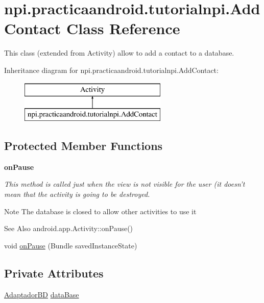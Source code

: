 \hypertarget{classnpi_1_1practicaandroid_1_1tutorialnpi_1_1_add_contact}{\section{npi.\-practicaandroid.\-tutorialnpi.\-Add\-Contact Class Reference}
\label{classnpi_1_1practicaandroid_1_1tutorialnpi_1_1_add_contact}
}


This class (extended from Activity) allow to add a contact to a database.  


Inheritance diagram for npi.\-practicaandroid.\-tutorialnpi.\-Add\-Contact\-:\begin{figure}[H]
\begin{center}
\leavevmode
\includegraphics[height=2.000000cm]{classnpi_1_1practicaandroid_1_1tutorialnpi_1_1_add_contact}
\end{center}
\end{figure}
\subsection*{Protected Member Functions}
\begin{Indent}{\bf on\-Pause}\par
{\em This method is called just when the view is not visible for the user (it doesn't mean that the activity is going to be destroyed.

\begin{DoxyNote}{Note}
The database is closed to allow other activities to use it
\end{DoxyNote}
\begin{DoxySeeAlso}{See Also}
android.\-app.\-Activity\-::on\-Pause() 
\end{DoxySeeAlso}
}\begin{DoxyCompactItemize}
\item 
void \hyperlink{classnpi_1_1practicaandroid_1_1tutorialnpi_1_1_add_contact_a03fcd12f05d4ccf27abf686130df9668}{on\-Pause} (Bundle saved\-Instance\-State)
\end{DoxyCompactItemize}
\end{Indent}
\subsection*{Private Attributes}
\begin{DoxyCompactItemize}
\item 
\hyperlink{classnpi_1_1practicaandroid_1_1tutorialnpi_1_1_adaptador_b_d}{Adaptador\-B\-D} \hyperlink{classnpi_1_1practicaandroid_1_1tutorialnpi_1_1_add_contact_acec65dc472e9b8ad4af1a55b16b6feec}{data\-Base}
\end{DoxyCompactItemize}
